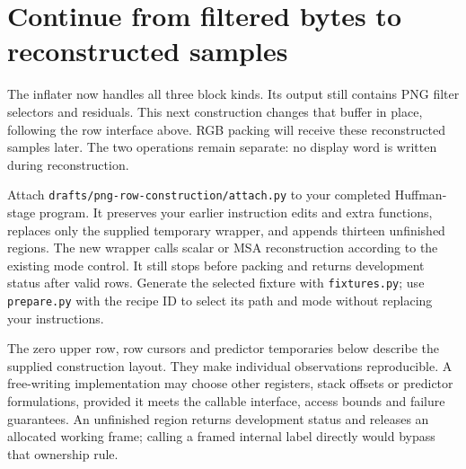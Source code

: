 \section{Continue from filtered bytes to reconstructed samples}
The inflater now handles all three block kinds. Its output still contains PNG filter
selectors and residuals. This next construction changes that buffer in place, following
the row interface above. RGB packing will receive these reconstructed samples later.
The two operations remain separate: no display word is written during reconstruction.

Attach \texttt{drafts/png-row-construction/attach.py} to your completed Huffman-stage
program. It preserves your earlier instruction edits and extra functions, replaces
only the supplied temporary wrapper, and appends thirteen unfinished regions. The
new wrapper calls scalar or MSA reconstruction according to the existing mode control.
It still stops before packing and returns development status after valid rows.
Generate the selected fixture with \texttt{fixtures.py}; use \texttt{prepare.py} with
the recipe ID to select its path and mode without replacing your instructions.

The zero upper row, row cursors and predictor temporaries below describe the supplied
construction layout. They make individual observations reproducible. A free-writing
implementation may choose other registers, stack offsets or predictor formulations,
provided it meets the callable interface, access bounds and failure guarantees.
An unfinished region returns development status and releases an allocated working
frame; calling a framed internal label directly would bypass that ownership rule.
